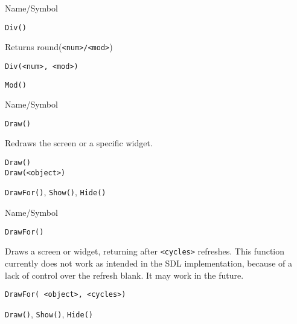 \rl



\begin{desc}{Name/Symbol}
\item[Name/Symbol]	\verb+Div()+

\item[Description]  	Returns round(\verb+<num>/<mod>+)

\item[Usage]
\begin{verbatim}
Div(<num>, <mod>)
\end{verbatim}

\item[Example]	

\item[See Also]	\verb+Mod()+
\end{desc}

\rl




\begin{desc}{Name/Symbol}
\item[Name/Symbol]	\verb+Draw()+

\item[Description]	Redraws the screen or a specific widget.

\item[Usage]
\begin{verbatim}
Draw()
Draw(<object>)
\end{verbatim}

\item[Example]	

\item[See Also]	\verb+DrawFor()+, \verb+Show()+, \verb+Hide()+
\end{desc}

\rl



\begin{desc}{Name/Symbol}
\item[Name/Symbol]	\verb+DrawFor()+

\item[Description] Draws a screen or widget, returning after
  \verb+<cycles>+ refreshes. This function currently does not work as
  intended in the SDL implementation, because of a lack of control
  over the refresh blank.  It may work in the future.

\item[Usage]
\begin{verbatim}
DrawFor( <object>, <cycles>)
\end{verbatim}

\item[Example]	

\item[See Also]	\verb+Draw()+, \verb+Show()+, \verb+Hide()+
\end{desc}

